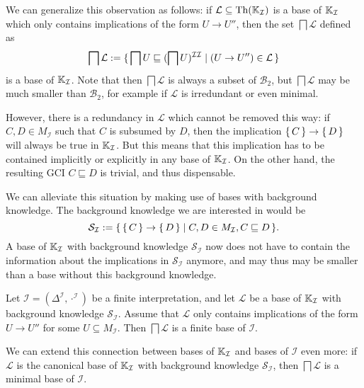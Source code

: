 We can generalize this observation as follows: if $\mathcal{L} \subseteq \operatorname{Th}({\mathbb{K}}_{\mathcal{I}})$ is a base of ${\mathbb{K}}_{\mathcal{I}}$ which only contains implications of
the form $U \to U''$, then the set $\bigsqcap \mathcal{L}$ defined as
\begin{equation*}
  \bigsqcap \mathcal{L} := {\{\, \bigsqcap U \sqsubseteq (\bigsqcap
    U)^{\mathcal{I}\mathcal{I}} \mid (U \to U'') \in \mathcal{L} \,\}}
\end{equation*}
is a base of ${\mathbb{K}}_{\mathcal{I}}$.  Note that then $\bigsqcap \mathcal{L}$ is always a
subset of $\mathcal{B}_2$, but $\bigsqcap \mathcal{L}$ may be much smaller than
$\mathcal{B}_2$, for example if $\mathcal{L}$ is irredundant or even minimal.

However, there is a redundancy in $\mathcal{L}$ which cannot be removed this way: if $C, D
\in M_{\mathcal{I}}$ such that $C$ is subsumed by $D$, then the implication ${\{\, C \,\}} \to
{\ensuremath{\{\, D \,\}}}$ will always be true in ${\mathbb{K}}_{\mathcal{I}}$.  But this means that this
implication has to be contained implicitly or explicitly in any base of ${\mathbb{K}}_{\mathcal{I}}$.  On the other hand, the resulting GCI $C \sqsubseteq D$ is trivial, and
thus dispensable.

We can alleviate this situation by making use of bases with background knowledge.  The
background knowledge we are interested in would be
\begin{equation}
  \label{eq:28}
  \mathcal{S}_{\mathcal{I}} := {\{\, {\{\, C \,\}} \to {\ensuremath{\{\, D \,\}}} \mid C, D \in
    M_{\mathcal{I}}, C \sqsubseteq D \,\}}.
\end{equation}
A base of ${\mathbb{K}}_{\mathcal{I}}$ with background knowledge $\mathcal{S}_{\mathcal{I}}$ now
does not have to contain the information about the implications in
$\mathcal{S}_{\mathcal{I}}$ anymore, and may thus may be smaller than a base without this
background knowledge.

\begin{Theorem}
  \label{thm:Felix-base-B3}
  Let $\mathcal{I} = (\Delta^{\mathcal{I}}, \cdot^{\mathcal{I}})$ be a finite
  interpretation, and let $\mathcal{L}$ be a base of ${\mathbb{K}}_{\mathcal{I}}$ with
  background knowledge $\mathcal{S}_{\mathcal{I}}$.  Assume that $\mathcal{L}$ only
  contains implications of the form $U \to U''$ for some $U \subseteq M_{\mathcal{I}}$.
  Then $\bigsqcap \mathcal{L}$ is a finite base of $\mathcal{I}$.
\end{Theorem}

We can extend this connection between bases of ${\mathbb{K}}_{\mathcal{I}}$ and bases of
$\mathcal{I}$ even more: if $\mathcal{L}$ is the canonical base of ${\mathbb{K}}_{\mathcal{I}}$
with background knowledge $\mathcal{S}_{\mathcal{I}}$, then $\bigsqcap \mathcal{L}$ is a
minimal base of $\mathcal{I}$.

